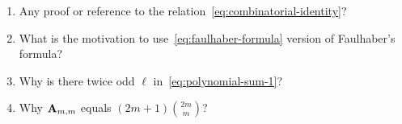 \begin{enumerate}
    \item Any proof or reference to the relation~\eqref{eq:combinatorial-identity}?
    \item What is the motivation to use~\eqref{eq:faulhaber-formula} version of Faulhaber's formula?
    \item Why is there twice odd $\ell$ in~\eqref{eq:polynomial-sum-1}?
    \item Why ${\mathbf{A}} \sb{m,m}$ equals $(2m+1) \binom{2m}{m}$?
\end{enumerate}